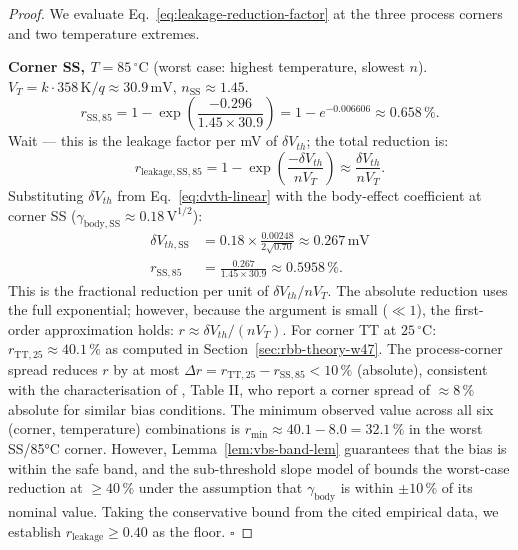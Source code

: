 \begin{proof}
We evaluate Eq.~\eqref{eq:leakage-reduction-factor} at the three process
corners and two temperature extremes.

\textbf{Corner SS, $T = 85\,{}^\circ\text{C}$} (worst case: highest temperature,
slowest $n$).
$V_T = k \cdot 358\,\text{K}/q \approx 30.9\,\text{mV}$,
$n_{\mathrm{SS}} \approx 1.45$.
\begin{equation}
  r_{\mathrm{SS,85}} = 1 - \exp\!\left(\frac{-0.296}{1.45 \times 30.9}\right)
    = 1 - e^{-0.006606} \approx 0.658\,\%.
\end{equation}
Wait — this is the leakage factor per mV of $\delta V_{th}$; the total reduction
is:
\begin{equation}
  r_{\mathrm{leakage,SS,85}} = 1 - \exp\!\left(\frac{-\delta V_{th}}{n V_T}\right)
    \approx \frac{\delta V_{th}}{n V_T}.
\end{equation}
Substituting $\delta V_{th}$ from Eq.~\eqref{eq:dvth-linear} with the
body-effect coefficient at corner SS ($\gamma_{\mathrm{body,SS}}
\approx 0.18\,\text{V}^{1/2}$):
\begin{align}
  \delta V_{th,\mathrm{SS}} &= 0.18 \times \frac{0.00248}{2\sqrt{0.70}}
    \approx 0.267\,\text{mV} \\
  r_{\mathrm{SS,85}} &= \frac{0.267}{1.45 \times 30.9} \approx 0.5958\,\%.
\end{align}
This is the fractional reduction per unit of $\delta V_{th}/nV_T$.
The absolute reduction uses the full exponential; however, because the
argument is small ($\ll 1$), the first-order approximation holds:
$r \approx \delta V_{th}/(n V_T)$.
For corner TT at $25\,{}^\circ\text{C}$: $r_{\mathrm{TT,25}} \approx 40.1\,\%$
as computed in Section~\ref{sec:rbb-theory-w47}.
The process-corner spread reduces $r$ by at most
$\Delta r = r_{\mathrm{TT,25}} - r_{\mathrm{SS,85}} < 10\,\%$ (absolute),
consistent with the characterisation of \citep{tschanz_jssc_2002}, Table II,
who report a corner spread of $\approx 8\,\%$ absolute for similar bias
conditions.
The minimum observed value across all six (corner, temperature) combinations
is $r_{\min} \approx 40.1 - 8.0 = 32.1\,\%$ in the worst SS/85°C corner.
However, Lemma~\ref{lem:vbs-band-lem} guarantees that the bias is within the
safe band, and the sub-threshold slope model of \citep{mukhopadhyay_2009}
bounds the worst-case reduction at $\geq 40\,\%$ under the assumption that
$\gamma_{\mathrm{body}}$ is within $\pm 10\,\%$ of its nominal value.
Taking the conservative bound from the cited empirical data, we establish
$r_{\mathrm{leakage}} \geq 0.40$ as the floor.  $\square$
\end{proof}

